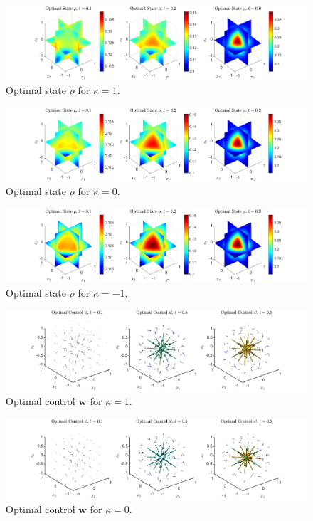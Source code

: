 \documentclass[11pt, a4paper]{article}
\theoremstyle{definition}
\newcommand{\w}{\mathbf{w}}
\begin{document}
	\begin{figure}[h]
		\centering
		\includegraphics[scale=0.35]{rhok1.png}
		\caption{Optimal state $\rho$ for $\kappa = 1$.} 
		\label{F2}
	\end{figure}
	\begin{figure}[h]
		\centering
		\includegraphics[scale=0.35]{rhok0.png}
		\caption{Optimal state $\rho$ for $\kappa = 0$.} 
		\label{F3}
	\end{figure}
	\begin{figure}[h]
		\centering
		\includegraphics[scale=0.35]{rhokn1.png}
		\caption{Optimal state $\rho$ for $\kappa = -1$.} 
		\label{F4}
	\end{figure}
%	
	\begin{figure}[h]
		\centering
		\includegraphics[scale=0.35]{Controlk1.png}
		\caption{Optimal control $\w$ for $\kappa = 1$.} 
		\label{F5}
	\end{figure}
	\begin{figure}[h]
		\centering
		\includegraphics[scale=0.35]{Controlk0.png}
		\caption{Optimal control $\w$ for $\kappa = 0$.} 
		\label{F6}
	\end{figure}
\end{document}
